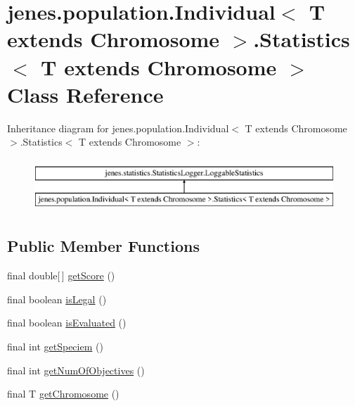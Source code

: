 \hypertarget{classjenes_1_1population_1_1_individual_3_01_t_01extends_01_chromosome_01_4_1_1_statistics_3_01_t_01extends_01_chromosome_01_4}{\section{jenes.\-population.\-Individual$<$ T extends Chromosome $>$.Statistics$<$ T extends Chromosome $>$ Class Reference}
\label{classjenes_1_1population_1_1_individual_3_01_t_01extends_01_chromosome_01_4_1_1_statistics_3_01_t_01extends_01_chromosome_01_4}
}
Inheritance diagram for jenes.\-population.\-Individual$<$ T extends Chromosome $>$.Statistics$<$ T extends Chromosome $>$\-:\begin{figure}[H]
\begin{center}
\leavevmode
\includegraphics[height=2.000000cm]{classjenes_1_1population_1_1_individual_3_01_t_01extends_01_chromosome_01_4_1_1_statistics_3_01_t_01extends_01_chromosome_01_4}
\end{center}
\end{figure}
\subsection*{Public Member Functions}
\begin{DoxyCompactItemize}
\item 
final double\mbox{[}$\,$\mbox{]} \hyperlink{classjenes_1_1population_1_1_individual_3_01_t_01extends_01_chromosome_01_4_1_1_statistics_3_01_t_01extends_01_chromosome_01_4_a55cc8b0a56cd428d90bd06a7f2adeae3}{get\-Score} ()
\item 
final boolean \hyperlink{classjenes_1_1population_1_1_individual_3_01_t_01extends_01_chromosome_01_4_1_1_statistics_3_01_t_01extends_01_chromosome_01_4_a468923155345a9a31e5bee34da9a0f0b}{is\-Legal} ()
\item 
final boolean \hyperlink{classjenes_1_1population_1_1_individual_3_01_t_01extends_01_chromosome_01_4_1_1_statistics_3_01_t_01extends_01_chromosome_01_4_a42a423ba7926917acd678e3bdd4487a4}{is\-Evaluated} ()
\item 
final int \hyperlink{classjenes_1_1population_1_1_individual_3_01_t_01extends_01_chromosome_01_4_1_1_statistics_3_01_t_01extends_01_chromosome_01_4_a2b4abbdd909594970e31d0febf47c511}{get\-Speciem} ()
\item 
final int \hyperlink{classjenes_1_1population_1_1_individual_3_01_t_01extends_01_chromosome_01_4_1_1_statistics_3_01_t_01extends_01_chromosome_01_4_ae934603dff4ab1854bb173fcb835aaf8}{get\-Num\-Of\-Objectives} ()
\item 
final T \hyperlink{classjenes_1_1population_1_1_individual_3_01_t_01extends_01_chromosome_01_4_1_1_statistics_3_01_t_01extends_01_chromosome_01_4_acceccfbdb5ba12424c5a43ecaff2b8c5}{get\-Chromosome} ()
\end{DoxyCompactItemize}
